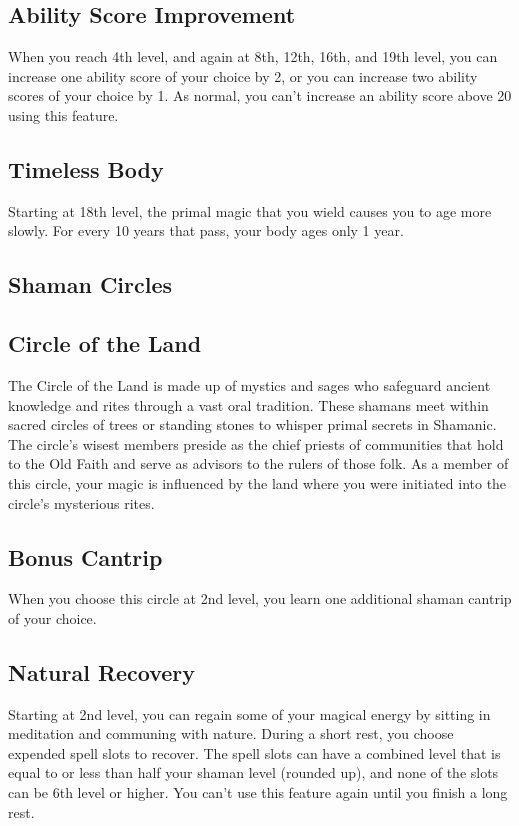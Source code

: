 \subsection{Ability Score Improvement}

When you reach 4th level, and again at 8th, 12th, 16th, and 19th level, you can increase one ability score of your choice by 2, or you can increase two ability scores of your choice by 1. As normal, you can’t increase an ability score above 20 using this feature.

\subsection{Timeless Body}

Starting at 18th level, the primal magic that you wield causes you to age more slowly. For every 10 years that pass, your body ages only 1 year.

\subsection{Shaman Circles}

\subsection{Circle of the Land}

The Circle of the Land is made up of mystics and sages who safeguard ancient knowledge and rites through a vast oral tradition. These shamans meet within sacred circles of trees or standing stones to whisper primal secrets in Shamanic. The circle’s wisest members preside as the chief priests of communities that hold to the Old Faith and serve as advisors to the rulers of those folk. As a member of this circle, your magic is influenced by the land where you were initiated into the circle’s mysterious rites.

\subsection{Bonus Cantrip}

When you choose this circle at 2nd level, you learn one additional shaman cantrip of your choice.

\subsection{Natural Recovery}

Starting at 2nd level, you can regain some of your magical energy by sitting in meditation and communing with nature. During a short rest, you choose expended spell slots to recover. The spell slots can have a combined level that is equal to or less than half your shaman level
(rounded up), and none of the slots can be 6th level or higher. You can’t use this feature again until you finish a long rest.

